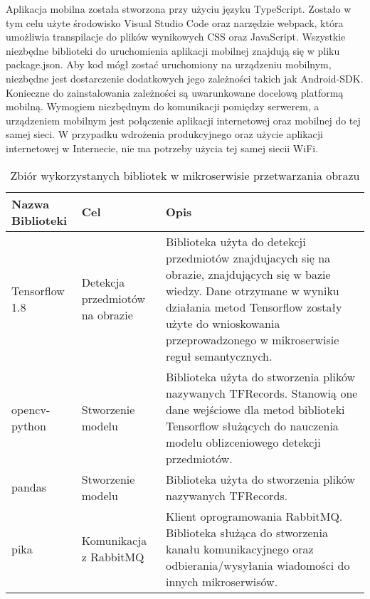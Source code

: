 Aplikacja mobilna została stworzona przy użyciu języku TypeScript. Zostało w tym celu użyte środowisko Visual Studio Code oraz narzędzie webpack, która umożliwia transpilacje do plików wynikowych CSS oraz JavaScript. Wszystkie niezbędne biblioteki do uruchomienia aplikacji mobilnej znajdują się w pliku package.json. Aby kod mógł zostać uruchomiony na urządzeniu mobilnym, niezbędne jest dostarczenie dodatkowych jego zależności takich jak Android-SDK. Konieczne do zainstalowania zależności są uwarunkowane docelową platformą mobilną. Wymogiem niezbędnym do komunikacji pomiędzy serwerem, a urządzeniem mobilnym jest połączenie aplikacji internetowej oraz mobilnej do tej samej sieci. W przypadku wdrożenia produkcyjnego oraz użycie aplikacji internetowej w Internecie, nie ma potrzeby użycia tej samej siecii WiFi.


\begin{center}
	\begin{longtable}{ | p{3.1cm} | p{4cm} | p{6.5cm} |}
		\caption{Zbiór wykorzystanych bibliotek w mikroserwisie przetwarzania obrazu}
		\label{librariesPython} \\
		\hline Nazwa \newline Biblioteki & Cel & Opis \\ \hline    
		
		\hline Tensorflow 1.8 &
		Detekcja przedmiotów na obrazie
		
		& Biblioteka użyta do detekcji przedmiotów znajdujacych się na obrazie, znajdujących się w bazie wiedzy. Dane otrzymane w wyniku działania metod Tensorflow zostały użyte do wnioskowania przeprowadzonego w mikroserwisie reguł semantycznych.\\ \hline


	\hline opencv-python &
	Stworzenie modelu
	
	& Biblioteka użyta do stworzenia plików nazywanych TFRecords. Stanowią one dane wejściowe dla metod biblioteki Tensorflow służących do nauczenia modelu oblizceniowego detekcji przedmiotów.\\ \hline	
	
	\hline pandas &
	Stworzenie modelu
	
	& Biblioteka użyta do stworzenia plików nazywanych TFRecords.\\ \hline	
	
	\hline pika &
	Komunikacja z \newline RabbitMQ
	
	& Klient oprogramowania RabbitMQ. Biblioteka służąca do stworzenia kanału komunikacyjnego oraz odbierania/wysyłania wiadomości do innych mikroserwisów.\\ \hline	
	
	\end{longtable}
\end{center}

